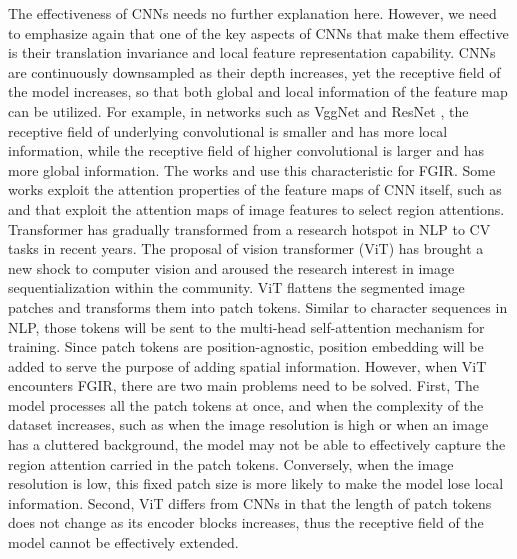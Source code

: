 \documentclass[sigconf]{acmart}
\begin{document}
The effectiveness of CNNs needs no further explanation here. However, we need to emphasize again that one of the key aspects of CNNs that make them effective is their translation invariance and local feature representation capability. CNNs are continuously downsampled as their depth increases, yet the receptive field of the model increases, so that both global and local information of the feature map can be utilized. For example, in networks such as VggNet \cite{vgg} and ResNet \cite{ResNet}, the receptive field of underlying convolutional is smaller and has more local information, while the receptive field of higher convolutional is larger and has more global information. The works \cite{Multi-attention} and \cite{learn2pay} use this characteristic for FGIR. Some works exploit the attention properties of the feature maps of CNN itself, such as \cite{MMAL-Net} and \cite{SCDA} that exploit the attention maps of image features to select region attentions.
Transformer \cite{attention_is} has gradually transformed from a research hotspot in NLP \cite{Bert, XL, XLNet} to  CV tasks \cite{ViT, deform} in recent years. The proposal of vision transformer (ViT) has brought a new shock to computer vision and aroused the research interest in image sequentialization within the community. ViT flattens the segmented image patches and transforms them into patch tokens. Similar to character sequences in NLP, those tokens will be sent to the multi-head self-attention mechanism for training. Since patch tokens are position-agnostic, position embedding will be added to serve the purpose of adding spatial information. However, when ViT encounters FGIR, there are two main problems need to be solved. First, The model processes all the patch tokens at once, and when the complexity of the dataset increases, such as when the image resolution is high or when an image has a cluttered background, the model may not be able to effectively capture the region attention carried in the patch tokens. Conversely, when the image resolution is low, this fixed patch size is more likely to make the model lose local information. Second, ViT differs from CNNs in that the length of patch tokens does not change as its encoder blocks increases, thus the receptive field of the model cannot be effectively extended.
\end{document}
